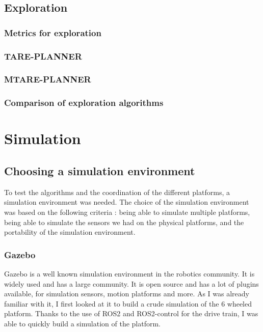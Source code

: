 \documentclass[11pt]{article}
\begin{document}
        \subsection{Exploration}
            \subsubsection{Metrics for exploration}
            \subsubsection{TARE-PLANNER}
            \subsubsection{MTARE-PLANNER}
            \subsubsection{Comparison of exploration algorithms}


    \newpage
    \section{Simulation}
        \subsection{Choosing a simulation environment}

            To test the algorithms and the coordination of the different platforms, a simulation environment was needed. The choice of the simulation environment was based on the following criteria : being able to simulate multiple platforms, being able to simulate the sensors we had on the physical platforms, and the portability of the simulation environment.


            \subsubsection{Gazebo}
                Gazebo is a well known simulation environment in the robotics community. It is widely used and has a large community. It is open source and has a lot of plugins available, for simulation sensors, motion platforms and more. As I was already familiar with it, I first looked at it to build a crude simulation of the 6 wheeled platform. Thanks to the use of ROS2 and ROS2-control for the drive train, I was able to quickly build a simulation of the platform. 
\end{document}

